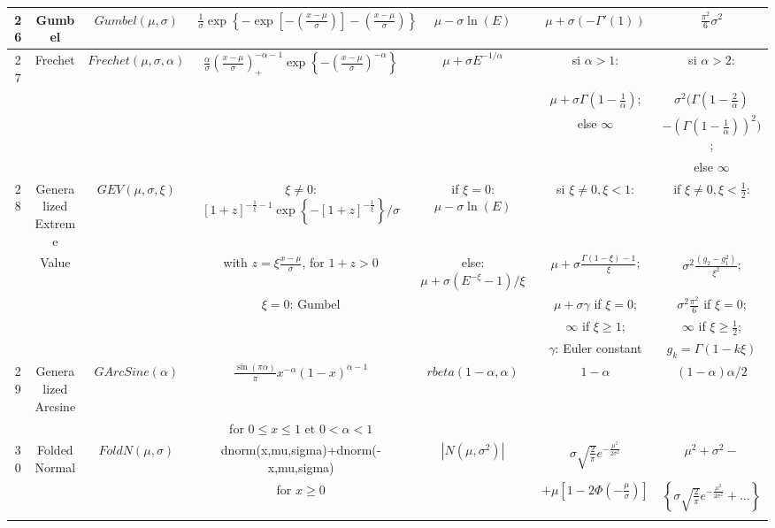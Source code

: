 \documentclass[10pt]{article}
\begin{document}
\begin{landscape}
\begin{center}
{\begin{longtable}{|c|c|c|c|c|c|c|}
\hline
26 & Gumbel & $Gumbel(\mu,\sigma)$ & $\frac{1}{\sigma}\exp\left\{-\exp\left[-\left(\frac{x-\mu}{\sigma}\right)\right]-\left(\frac{x-\mu}{\sigma}\right)\right\}$ & $\mu - \sigma\ln(E)$ & $\mu+\sigma(-\Gamma'(1))$ & $\frac{\pi^2}{6}\sigma^2$ \\
\hline
27 & Frechet & $Frechet(\mu,\sigma,\alpha)$ & $\frac{\alpha}{\sigma}\left(\frac{x-\mu}{\sigma}\right)_{+}^{-\alpha-1}\exp\left\{-\left(\frac{x-\mu}{\sigma}\right)^{-\alpha}\right\}$
   & $\mu+\sigma E^{-1/\alpha}$ & si $\alpha>1$: & si $\alpha>2$: \\
   & & & & & $\mu+\sigma\Gamma(1-\frac{1}{\alpha})$; & $\sigma^2(\Gamma(1-\frac{2}{\alpha})$ \\
   & & & & & else $\infty$ & $-(\Gamma(1-\frac{1}{\alpha}))^2)$; \\
   & & & & & & else $\infty$ \\
\hline
28 & Generalized Extreme  & $GEV(\mu,\sigma,\xi)$ & $\xi\ne0$: $[1+z]^{-\frac{1}{\xi}-1}\exp\left\{-[1+z]^{-\frac{1}{\xi}}\right\}/\sigma$ & if $\xi=0$: $\mu - \sigma\ln(E)$
   & si $\xi\neq0, \xi<1$: & if $\xi\neq0, \xi<\frac{1}{2}$: \\
   & Value & & with $z=\xi\frac{x-\mu}{\sigma}$, for $1+z > 0$ & else: $\mu+\sigma (E^{-\xi}-1)/\xi$ & $\mu+\sigma\frac{\Gamma(1-\xi)-1}{\xi}$;
   & $\sigma^2\frac{(g_2-g_1^2)}{\xi^2}$; \\
   & & & $\xi=0$: Gumbel & & $\mu+\sigma\gamma$ if $\xi=0$; & $\sigma^2\frac{\pi^2}{6}$ if $\xi=0$; \\
   & & &                 & & $\infty$ if $\xi\geq1$; & $\infty$ if $\xi\geq\frac{1}{2}$; \\
   & & &                 & & $\gamma$: Euler constant & $g_k=\Gamma(1-k\xi)$ \\
\hline
29 & Generalized Arcsine & $GArcSine(\alpha)$ & $\frac{\sin(\pi\alpha)}{\pi}x^{-\alpha}(1-x)^{\alpha-1}$ & $rbeta(1-\alpha,\alpha)$ & $1-\alpha$ & $(1-\alpha)\alpha/2$ \\
   & & & for $0 \leq x \leq 1$ et $0 < \alpha < 1$ & & & \\
\hline
30 & Folded Normal & $FoldN(\mu,\sigma)$ & dnorm(x,mu,sigma)+dnorm(-x,mu,sigma) & $|N(\mu,\sigma^2)|$ & $\sigma\sqrt{\frac{2}{\pi}}e^{-\frac{\mu^2}{2\sigma^2}}$ & $\mu^2+\sigma^2-$ \\
   & & & for $x\geq0$ & & $+\mu[1-2\Phi(-\frac{\mu}{\sigma})]$ & $\left\{\sigma\sqrt{\frac{2}{\pi}}e^{-\frac{\mu^2}{2\sigma^2}}+\ldots \right\}$ \\
   & & & & &                                      &

\end{longtable}}
\end{center}
\end{landscape}
\end{document}
